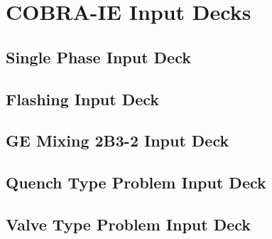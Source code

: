 \chapter{COBRA-IE Input Decks}
\label{app:input_decks}

\section{Single Phase Input Deck}

\section{Flashing Input Deck}

\section{GE Mixing 2B3-2 Input Deck}

\section{Quench Type Problem Input Deck}

\section{Valve Type Problem Input Deck}
